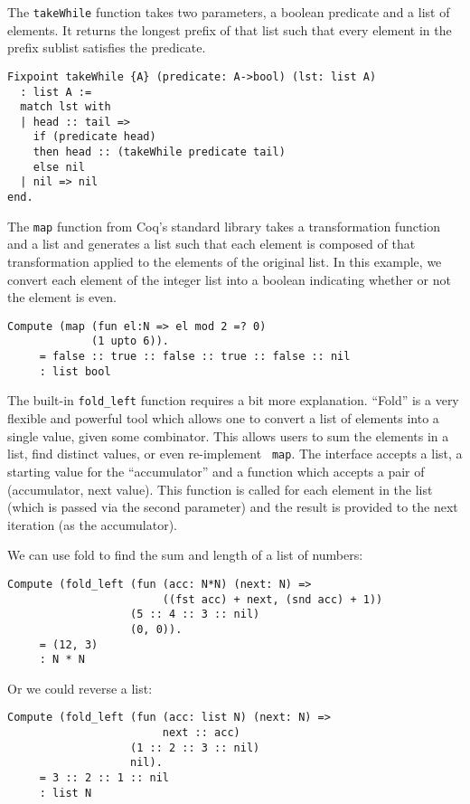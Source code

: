 \documentclass[nocopyrightspace,preprint]{sigplanconf}
\begin{document}
The {\tt takeWhile} function takes two parameters, a boolean predicate and a
list of elements. It returns the longest prefix of that list such that every
element in the prefix sublist satisfies the predicate.

\begin{lstlisting}
Fixpoint takeWhile {A} (predicate: A->bool) (lst: list A)
  : list A :=
  match lst with
  | head :: tail => 
    if (predicate head) 
    then head :: (takeWhile predicate tail)
    else nil
  | nil => nil
end.
\end{lstlisting}

The {\tt map} function from Coq's standard library takes a transformation
function and a list and generates a list such that each element is composed of
that transformation applied to the elements of the original list. In this
example, we convert each element of the integer list into a boolean indicating
whether or not the element is even.

\begin{lstlisting}
Compute (map (fun el:N => el mod 2 =? 0)
             (1 upto 6)).
     = false :: true :: false :: true :: false :: nil
     : list bool
\end{lstlisting}

The built-in {\tt fold\_left} function requires a bit more explanation.
``Fold'' is a very flexible and powerful tool which allows one to convert a
list of elements into a single value, given some combinator. This allows users
to sum the elements in a list, find distinct values, or even re-implement {\tt
map}. The interface accepts a list, a starting value for the ``accumulator''
and a function which accepts a pair of (accumulator, next value). This
function is called for each element in the list (which is passed via the
second parameter) and the result is provided to the next iteration (as the
accumulator).

We can use fold to find the sum and length of a list of numbers:

\begin{lstlisting}
Compute (fold_left (fun (acc: N*N) (next: N) =>
                        ((fst acc) + next, (snd acc) + 1))
                   (5 :: 4 :: 3 :: nil)
                   (0, 0)).
     = (12, 3)
     : N * N
\end{lstlisting}

Or we could reverse a list:

\begin{lstlisting}
Compute (fold_left (fun (acc: list N) (next: N) =>
                        next :: acc)
                   (1 :: 2 :: 3 :: nil)
                   nil).
     = 3 :: 2 :: 1 :: nil
     : list N
\end{lstlisting}
\end{document}
